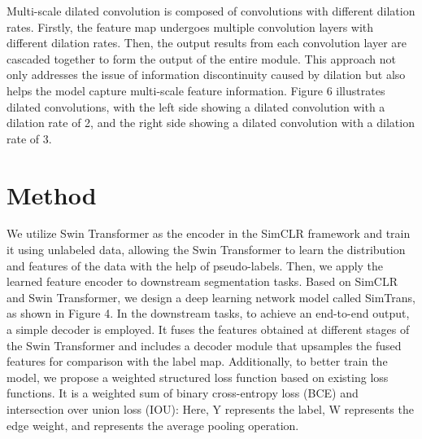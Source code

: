 \documentclass[10pt,twocolumn,letterpaper]{article}
\begin{document}
Multi-scale dilated convolution is composed of convolutions with different dilation rates. Firstly, the feature map undergoes multiple convolution layers with different dilation rates. Then, the output results from each convolution layer are cascaded together to form the output of the entire module. This approach not only addresses the issue of information discontinuity caused by dilation but also helps the model capture multi-scale feature information. Figure 6 illustrates dilated convolutions, with the left side showing a dilated convolution with a dilation rate of 2, and the right side showing a dilated convolution with a dilation rate of 3.



\section{Method}
\label{sec:method}

We utilize Swin Transformer as the encoder in the SimCLR framework and train it using unlabeled data, allowing the Swin Transformer to learn the distribution and features of the data with the help of pseudo-labels. Then, we apply the learned feature encoder to downstream segmentation tasks. Based on SimCLR and Swin Transformer, we design a deep learning network model called SimTrans, as shown in Figure 4. In the downstream tasks, to achieve an end-to-end output, a simple decoder is employed. It fuses the features obtained at different stages of the Swin Transformer and includes a decoder module that upsamples the fused features for comparison with the label map. Additionally, to better train the model, we propose a weighted structured loss function based on existing loss functions. It is a weighted sum of binary cross-entropy loss (BCE) and intersection over union loss (IOU):
Here, Y represents the label, W represents the edge weight, and represents the average pooling operation.
\end{document}
